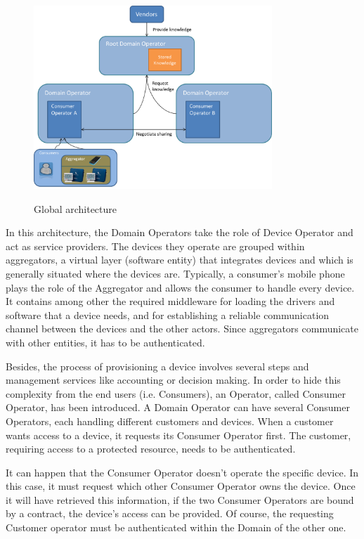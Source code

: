 \begin{figure}[!ht]
	\centering
	\includegraphics[width=0.8\textwidth]{images/design.png}\\
	\caption{Global architecture}
	\label{fig:concept__architecture}
\end{figure}

In this architecture, the Domain Operators take the role of Device Operator and act as service providers. The devices they operate are grouped within aggregators, a virtual layer (software entity) that integrates devices and which is generally situated where the devices are. Typically, a consumer's mobile phone plays the role of the Aggregator and allows the consumer to handle every device. It contains among other the required middleware for loading the drivers and software that a device needs, and for establishing a reliable communication channel between the devices and the other actors. Since aggregators communicate with other entities, it has to be authenticated.

	Besides, the process of provisioning a device involves several steps and management services like accounting or decision making. In order to hide this complexity from the end users (i.e. Consumers), an Operator, called Consumer Operator, has been introduced. A Domain Operator can have several Consumer Operators, each handling different customers and devices. When a customer wants access to a device, it requests its Consumer Operator first. The customer, requiring access to a protected resource, needs to be authenticated. 

It can happen that the Consumer Operator doesn't operate the specific device. In this case, it must request which other Consumer Operator owns the device. Once it will have retrieved this information, if the two Consumer Operators are bound by a contract, the device's access can be provided. Of course, the requesting Customer operator must be authenticated within the Domain of the other one.

